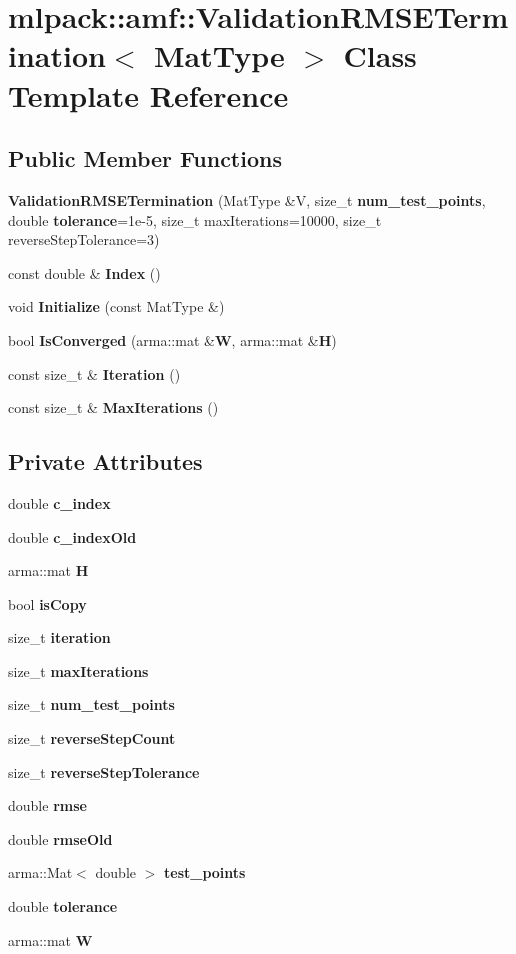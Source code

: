 \section{mlpack\-:\-:amf\-:\-:Validation\-R\-M\-S\-E\-Termination$<$ Mat\-Type $>$ Class Template Reference}
\label{classmlpack_1_1amf_1_1ValidationRMSETermination}
\subsection*{Public Member Functions}
\begin{DoxyCompactItemize}
\item 
{\bf Validation\-R\-M\-S\-E\-Termination} (Mat\-Type \&V, size\-\_\-t {\bf num\-\_\-test\-\_\-points}, double {\bf tolerance}=1e-\/5, size\-\_\-t max\-Iterations=10000, size\-\_\-t reverse\-Step\-Tolerance=3)
\item 
const double \& {\bf Index} ()
\item 
void {\bf Initialize} (const Mat\-Type \&)
\item 
bool {\bf Is\-Converged} (arma\-::mat \&{\bf W}, arma\-::mat \&{\bf H})
\item 
const size\-\_\-t \& {\bf Iteration} ()
\item 
const size\-\_\-t \& {\bf Max\-Iterations} ()
\end{DoxyCompactItemize}
\subsection*{Private Attributes}
\begin{DoxyCompactItemize}
\item 
double {\bf c\-\_\-index}
\item 
double {\bf c\-\_\-index\-Old}
\item 
arma\-::mat {\bf H}
\item 
bool {\bf is\-Copy}
\item 
size\-\_\-t {\bf iteration}
\item 
size\-\_\-t {\bf max\-Iterations}
\item 
size\-\_\-t {\bf num\-\_\-test\-\_\-points}
\item 
size\-\_\-t {\bf reverse\-Step\-Count}
\item 
size\-\_\-t {\bf reverse\-Step\-Tolerance}
\item 
double {\bf rmse}
\item 
double {\bf rmse\-Old}
\item 
arma\-::\-Mat$<$ double $>$ {\bf test\-\_\-points}
\item 
double {\bf tolerance}
\item 
arma\-::mat {\bf W}
\end{DoxyCompactItemize}


